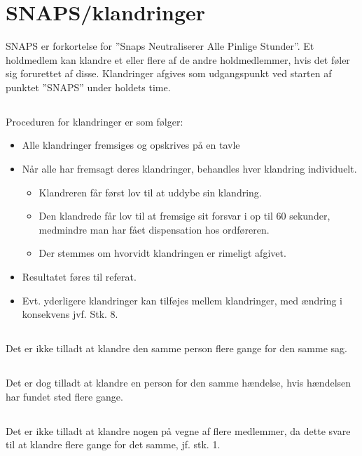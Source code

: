 \documentclass{article}
\begin{document}
\section{SNAPS/klandringer}
SNAPS er forkortelse for ”Snaps Neutraliserer Alle Pinlige Stunder”. Et holdmedlem kan klandre et eller flere af de andre holdmedlemmer, hvis det føler sig forurettet af disse. Klandringer afgives som udgangspunkt ved starten af punktet ”SNAPS” under holdets time.
\subsection{}
Proceduren for klandringer er som følger:
\begin{itemize}
    \item Alle klandringer fremsiges og opskrives på en tavle
    \item Når alle har fremsagt deres klandringer, behandles hver klandring individuelt.
    \begin{itemize}
        \item Klandreren får først lov til at uddybe sin klandring.
        \item Den klandrede får lov til at fremsige sit forsvar i op til 60 sekunder, medmindre man har fået dispensation hos ordføreren.
        \item Der stemmes om hvorvidt klandringen er rimeligt afgivet.
    \end{itemize}
    \item Resultatet føres til referat.
    \item Evt. yderligere klandringer kan tilføjes mellem klandringer, med ændring i konsekvens jvf. Stk. 8.  
\end{itemize}
\subsection{}
Det er ikke tilladt at klandre den samme person flere gange for den samme sag.
\subsection{}
Det er dog tilladt at klandre en person for den samme hændelse, hvis hændelsen har fundet sted flere gange.
\subsection{}
Det er ikke tilladt at klandre nogen på vegne af flere medlemmer, da dette svare til at klandre flere gange for det samme, jf. stk. 1.
\end{document}
